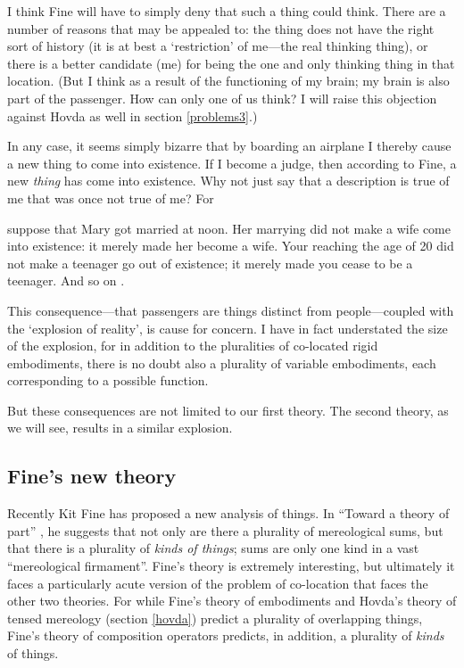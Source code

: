 \documentclass[11pt]{article}
\newenvironment{squote}{%
\begin{spacing}{1}
\begin{list}{}{%
\setlength{\labelwidth}{0pt}%
\rightmargin\leftmargin%
}
\item\relax
}{%
\end{list}%
\end{spacing}
}
\begin{document}
\begin{spacing}{1.5}
I think Fine will have to simply deny that such a thing could think.
There are a number of reasons that may be appealed to: the thing does
not have the right sort of history (it is at best a `restriction' of
me---the real thinking thing), or there is a better candidate (me) for
being the one and only thinking thing in that location.  (But I think
as a result of the functioning of my brain; my brain is also part of
the passenger.  How can only one of us think?  I will raise this
objection against Hovda as well in section \ref{problems3}.)

In any case, it seems simply bizarre that by boarding an airplane I
thereby cause a new thing to come into existence.  If I become a
judge, then according to Fine, a new {\em thing} has come into
existence.  Why not just say that a description is true of me that was
once not true of me?  For

\begin{squote}
suppose that Mary got married at noon.  Her marrying did not make a
wife come into existence: it merely made her become a wife.  Your
reaching the age of 20 did not make a teenager go out of existence; it
merely made you cease to be a teenager.  And so on
\citep[151]{thomson1998a}.
\end{squote}

This consequence---that passengers are things distinct from
people---coupled with the `explosion of reality', is cause for
concern.  I have in fact understated the size of the explosion, for in
addition to the pluralities of co-located rigid embodiments, there is
no doubt also a plurality of variable embodiments, each corresponding
to a possible function.

But these consequences are not limited to our first theory.  The
second theory, as we will see, results in a similar explosion.

\subsection{Fine's new theory}
\label{new-old}
Recently Kit Fine has proposed a new analysis of things.  In ``Toward
a theory of part'' \citeyearpar{fine2010}, he suggests that not only
are there a plurality of mereological sums, but that there is a
plurality of {\em kinds of things}; sums are only one kind in a vast
``mereological firmament''.  Fine's theory is extremely interesting,
but ultimately it faces a particularly acute version of the problem of
co-location that faces the other two theories.  For while Fine's
theory of embodiments and Hovda's theory of tensed mereology (section
\ref{hovda}) predict a plurality of overlapping things, Fine's theory
of composition operators predicts, in addition, a plurality of {\em
  kinds} of things.


\end{spacing}
\end{document}
